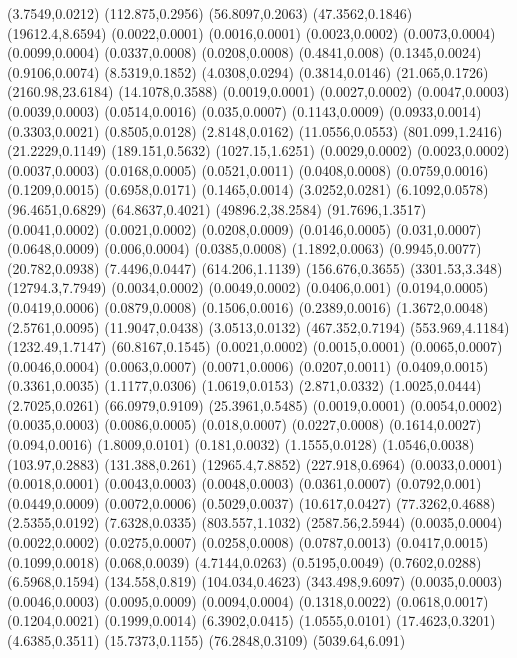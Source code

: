 {(3.7549,0.0212)%
(112.875,0.2956)%
(56.8097,0.2063)%
(47.3562,0.1846)%
(19612.4,8.6594)%
(0.0022,0.0001)%
(0.0016,0.0001)%
(0.0023,0.0002)%
(0.0073,0.0004)%
(0.0099,0.0004)%
(0.0337,0.0008)%
(0.0208,0.0008)%
(0.4841,0.008)%
(0.1345,0.0024)%
(0.9106,0.0074)%
(8.5319,0.1852)%
(4.0308,0.0294)%
(0.3814,0.0146)%
(21.065,0.1726)%
(2160.98,23.6184)%
(14.1078,0.3588)%
(0.0019,0.0001)%
(0.0027,0.0002)%
(0.0047,0.0003)%
(0.0039,0.0003)%
(0.0514,0.0016)%
(0.035,0.0007)%
(0.1143,0.0009)%
(0.0933,0.0014)%
(0.3303,0.0021)%
(0.8505,0.0128)%
(2.8148,0.0162)%
(11.0556,0.0553)%
(801.099,1.2416)%
(21.2229,0.1149)%
(189.151,0.5632)%
(1027.15,1.6251)%
(0.0029,0.0002)%
(0.0023,0.0002)%
(0.0037,0.0003)%
(0.0168,0.0005)%
(0.0521,0.0011)%
(0.0408,0.0008)%
(0.0759,0.0016)%
(0.1209,0.0015)%
(0.6958,0.0171)%
(0.1465,0.0014)%
(3.0252,0.0281)%
(6.1092,0.0578)%
(96.4651,0.6829)%
(64.8637,0.4021)%
(49896.2,38.2584)%
(91.7696,1.3517)%
(0.0041,0.0002)%
(0.0021,0.0002)%
(0.0208,0.0009)%
(0.0146,0.0005)%
(0.031,0.0007)%
(0.0648,0.0009)%
(0.006,0.0004)%
(0.0385,0.0008)%
(1.1892,0.0063)%
(0.9945,0.0077)%
(20.782,0.0938)%
(7.4496,0.0447)%
(614.206,1.1139)%
(156.676,0.3655)%
(3301.53,3.348)%
(12794.3,7.7949)%
(0.0034,0.0002)%
(0.0049,0.0002)%
(0.0406,0.001)%
(0.0194,0.0005)%
(0.0419,0.0006)%
(0.0879,0.0008)%
(0.1506,0.0016)%
(0.2389,0.0016)%
(1.3672,0.0048)%
(2.5761,0.0095)%
(11.9047,0.0438)%
(3.0513,0.0132)%
(467.352,0.7194)%
(553.969,4.1184)%
(1232.49,1.7147)%
(60.8167,0.1545)%
(0.0021,0.0002)%
(0.0015,0.0001)%
(0.0065,0.0007)%
(0.0046,0.0004)%
(0.0063,0.0007)%
(0.0071,0.0006)%
(0.0207,0.0011)%
(0.0409,0.0015)%
(0.3361,0.0035)%
(1.1177,0.0306)%
(1.0619,0.0153)%
(2.871,0.0332)%
(1.0025,0.0444)%
(2.7025,0.0261)%
(66.0979,0.9109)%
(25.3961,0.5485)%
(0.0019,0.0001)%
(0.0054,0.0002)%
(0.0035,0.0003)%
(0.0086,0.0005)%
(0.018,0.0007)%
(0.0227,0.0008)%
(0.1614,0.0027)%
(0.094,0.0016)%
(1.8009,0.0101)%
(0.181,0.0032)%
(1.1555,0.0128)%
(1.0546,0.0038)%
(103.97,0.2883)%
(131.388,0.261)%
(12965.4,7.8852)%
(227.918,0.6964)%
(0.0033,0.0001)%
(0.0018,0.0001)%
(0.0043,0.0003)%
(0.0048,0.0003)%
(0.0361,0.0007)%
(0.0792,0.001)%
(0.0449,0.0009)%
(0.0072,0.0006)%
(0.5029,0.0037)%
(10.617,0.0427)%
(77.3262,0.4688)%
(2.5355,0.0192)%
(7.6328,0.0335)%
(803.557,1.1032)%
(2587.56,2.5944)%
(0.0035,0.0004)%
(0.0022,0.0002)%
(0.0275,0.0007)%
(0.0258,0.0008)%
(0.0787,0.0013)%
(0.0417,0.0015)%
(0.1099,0.0018)%
(0.068,0.0039)%
(4.7144,0.0263)%
(0.5195,0.0049)%
(0.7602,0.0288)%
(6.5968,0.1594)%
(134.558,0.819)%
(104.034,0.4623)%
(343.498,9.6097)%
(0.0035,0.0003)%
(0.0046,0.0003)%
(0.0095,0.0009)%
(0.0094,0.0004)%
(0.1318,0.0022)%
(0.0618,0.0017)%
(0.1204,0.0021)%
(0.1999,0.0014)%
(6.3902,0.0415)%
(1.0555,0.0101)%
(17.4623,0.3201)%
(4.6385,0.3511)%
(15.7373,0.1155)%
(76.2848,0.3109)%
(5039.64,6.091)%
}

